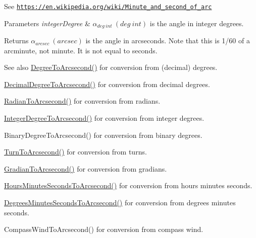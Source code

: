 See \href{https://en.wikipedia.org/wiki/Minute_and_second_of_arc}{\tt https\+://en.\+wikipedia.\+org/wiki/\+Minute\+\_\+and\+\_\+second\+\_\+of\+\_\+arc} 
\begin{DoxyParams}{Parameters}
{\em integer\+Degree} & $\alpha_{deg\ int}\ (deg\ int)$ is the angle in integer degrees. \\
\hline
\end{DoxyParams}
\begin{DoxyReturn}{Returns}
$\alpha_{arcsec}\ (arcsec)$ is the angle in arcseconds. Note that this is 1/60 of a arcminute, not minute. It is not equal to seconds. 
\end{DoxyReturn}
\begin{DoxySeeAlso}{See also}
\mbox{\hyperlink{group___e_g_x_math-_angle_conversions-_degree_gaf85e2d765c248f447854a807a68a5de8}{Degree\+To\+Arcsecond()}} for conversion from (decimal) degrees. 

\mbox{\hyperlink{group___e_g_x_math-_angle_conversions-_decimal_degree_gab9d5635a6e35127b5245978aba508962}{Decimal\+Degree\+To\+Arcsecond()}} for conversion from decimal degrees. 

\mbox{\hyperlink{group___e_g_x_math-_angle_conversions-_radian_ga2f952f6675a0fc54bf72bfe4e3d2664a}{Radian\+To\+Arcsecond()}} for conversion from radians. 

\mbox{\hyperlink{group___e_g_x_math-_angle_conversions-_integer_degree_gaa04058a2fea3dc3678264a05fac6e1ae}{Integer\+Degree\+To\+Arcsecond()}} for conversion from integer degrees. 

Binary\+Degree\+To\+Arcsecond() for conversion from binary degrees. 

\mbox{\hyperlink{group___e_g_x_math-_angle_conversions-_turn_gaad072969abc59ef6f5b63ac6a176a11b}{Turn\+To\+Arcsecond()}} for conversion from turns. 

\mbox{\hyperlink{group___e_g_x_math-_angle_conversions-_gradian_gac768fd444195264165d332f2f5e84d92}{Gradian\+To\+Arcsecond()}} for conversion from gradians. 

\mbox{\hyperlink{group___e_g_x_math-_angle_conversions-_hours_minutes_seconds_ga14620899c81c1f5e65cde96ef4ee626e}{Hours\+Minutes\+Seconds\+To\+Arcsecond()}} for conversion from hours minutes seconds. 

\mbox{\hyperlink{group___e_g_x_math-_angle_conversions-_degrees_minutes_seconds_gabebc8a012be0442c12409a2a71661ed4}{Degrees\+Minutes\+Seconds\+To\+Arcsecond()}} for conversion from degrees minutes seconds. 

Compass\+Wind\+To\+Arcsecond() for conversion from compass wind. 
\end{DoxySeeAlso}
\mbox{\label{group___e_g_x_math-_angle_conversions-_integer_degree_ga694bbfe624c3c14e97ce6155ca9bc44d}} 
